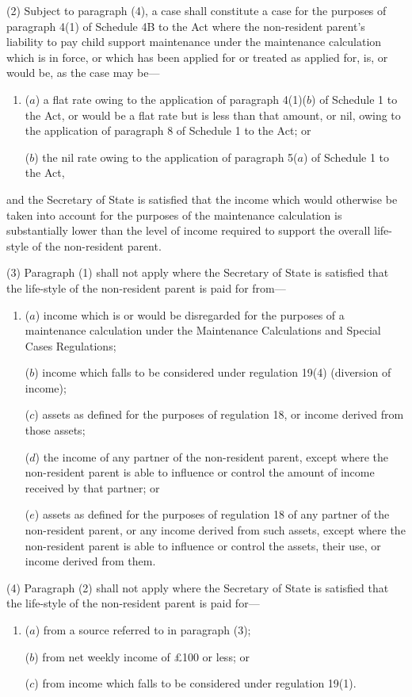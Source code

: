 \documentclass[12pt,a4paper]{article}
\begin{document}
(2) Subject to paragraph (4), a case shall constitute a case for the purposes of paragraph 4(1) of Schedule 4B to the Act where the non-resident parent’s liability to pay child support maintenance under the maintenance calculation which is in force, or which has been applied for or treated as applied for, is, or would be, as the case may be—
\begin{enumerate}\item[]
($a$) a flat rate owing to the application of paragraph 4(1)($b$)  of Schedule 1 to the Act, or would be a flat rate but is less than that amount, or nil, owing to the application of paragraph 8 of Schedule 1 to the Act; or

($b$) the nil rate owing to the application of paragraph 5($a$)  of Schedule 1 to the Act,
\end{enumerate}
and the Secretary of State is satisfied that the income which would otherwise be taken into account for the purposes of the maintenance calculation is substantially lower than the level of income required to support the overall life-style of the non-resident parent.

(3) Paragraph (1) shall not apply where the Secretary of State is satisfied that the life-style of the non-resident parent is paid for from—
\begin{enumerate}\item[]
($a$) income which is or would be disregarded for the purposes of a maintenance calculation under the Maintenance Calculations and Special Cases Regulations;

($b$) income which falls to be considered under regulation 19(4) (diversion of income);

($c$) assets as defined for the purposes of regulation 18, or income derived from those assets;

($d$) the income of any partner of the non-resident parent, except where the non-resident parent is able to influence or control the amount of income received by that partner; or

($e$) assets as defined for the purposes of regulation 18 of any partner of the non-resident parent, or any income derived from such assets, except where the non-resident parent is able to influence or control the assets, their use, or income derived from them.
\end{enumerate}

(4) Paragraph (2) shall not apply where the Secretary of State is satisfied that the life-style of the non-resident parent is paid for—
\begin{enumerate}\item[]
($a$) from a source referred to in paragraph (3);

($b$) from net weekly income of £100 or less; or

($c$) from income which falls to be considered under regulation 19(1).
\end{enumerate}
\end{document}
